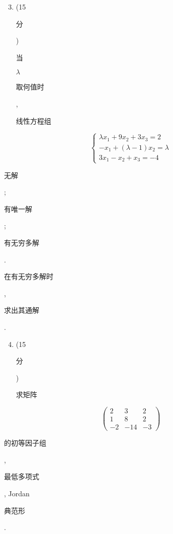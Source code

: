 \documentclass[10pt]{article}
\begin{document}
\begin{enumerate}
  \setcounter{enumi}{2}
  \item (15 \begin{CJK}{UTF8}{mj}分\end{CJK}) \begin{CJK}{UTF8}{mj}当\end{CJK} $\lambda$ \begin{CJK}{UTF8}{mj}取何值时\end{CJK}, \begin{CJK}{UTF8}{mj}线性方程组\end{CJK}
\end{enumerate}
$$
\left\{\begin{array}{c}
\lambda x_{1}+9 x_{2}+3 x_{3}=2 \\
-x_{1}+(\lambda-1) x_{2}=\lambda \\
3 x_{1}-x_{2}+x_{3}=-4
\end{array}\right.
$$
\begin{CJK}{UTF8}{mj}无解\end{CJK}; \begin{CJK}{UTF8}{mj}有唯一解\end{CJK}; \begin{CJK}{UTF8}{mj}有无穷多解\end{CJK}. \begin{CJK}{UTF8}{mj}在有无穷多解时\end{CJK}, \begin{CJK}{UTF8}{mj}求出其通解\end{CJK}.

\begin{enumerate}
  \setcounter{enumi}{3}
  \item (15 \begin{CJK}{UTF8}{mj}分\end{CJK}) \begin{CJK}{UTF8}{mj}求矩阵\end{CJK}
\end{enumerate}
$$
\left(\begin{array}{ccc}
2 & 3 & 2 \\
1 & 8 & 2 \\
-2 & -14 & -3
\end{array}\right)
$$
\begin{CJK}{UTF8}{mj}的初等因子组\end{CJK}, \begin{CJK}{UTF8}{mj}最低多项式\end{CJK}, Jordan \begin{CJK}{UTF8}{mj}典范形\end{CJK}.
\end{document}
